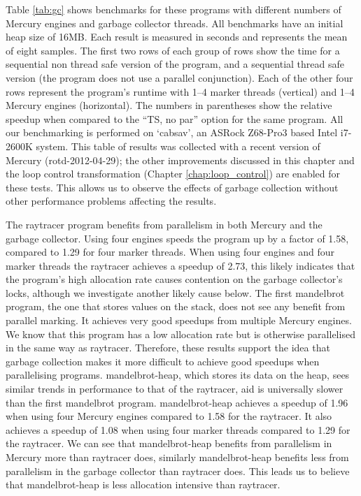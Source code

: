 Table \ref{tab:gc} shows benchmarks for these programs
with different numbers of Mercury engines and garbage collector threads.
All benchmarks have an initial heap size of 16MB.
Each result is measured in seconds and represents the mean of eight samples.
The first two rows of each group of rows show the time for a sequential
non thread safe version of the program,
and a sequential thread safe version
(the program does not use a parallel conjunction).
Each of the other four rows represent the program's runtime with
1--4 marker threads (vertical) and
1--4 Mercury engines (horizontal).
The numbers in parentheses show the relative speedup when compared to the
``TS, no par'' option for the same program.
All our benchmarking is performed on `cabsav',
an ASRock Z68-Pro3 based Intel i7-2600K system.
This table of results was collected with a recent version of Mercury
(rotd-2012-04-29);
the other improvements discussed in this chapter and the loop control
transformation (Chapter \ref{chap:loop_control})
are enabled for these tests.
This allows us to observe the effects of garbage collection without
other performance problems affecting the results.

The raytracer program benefits from parallelism in both Mercury and the
garbage collector.
Using four engines speeds the program up by a factor of 1.58,
compared to 1.29 for four marker threads.
When using four engines and four marker threads the raytracer
achieves a speedup of 2.73,
this likely indicates that the program's high allocation rate causes
contention on the garbage collector's locks,
although we investigate another likely cause below.
The first mandelbrot program, the one that stores values on the stack,
does not see any benefit from parallel marking.
It achieves very good speedups from multiple Mercury engines.
We know that this program has a low allocation rate
but is otherwise parallelised in the same way as raytracer.
Therefore,
these results support the idea that garbage collection makes it more
difficult to achieve good speedups when parallelising programs.
mandelbrot-heap, which stores its data on the heap,
sees similar trends in performance to that of the raytracer,
aid is universally slower than the first mandelbrot program.
mandelbrot-heap achieves a speedup of 1.96 when using four Mercury engines
compared to 1.58 for the raytracer.
It also achieves a speedup of 1.08 when using four marker threads compared
to 1.29 for the raytracer.
We can see that mandelbrot-heap benefits from parallelism in Mercury
more than raytracer does,
similarly mandelbrot-heap benefits less from parallelism in the garbage
collector than raytracer does.
This leads us to believe that mandelbrot-heap is less allocation intensive
than raytracer.

